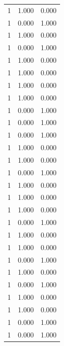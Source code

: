\begin{tabular}{rrr}
1 & 1.000 & 0.000 \\
1 & 0.000 & 1.000 \\
1 & 1.000 & 0.000 \\
1 & 0.000 & 1.000 \\
1 & 1.000 & 0.000 \\
1 & 1.000 & 0.000 \\
1 & 1.000 & 0.000 \\
1 & 1.000 & 0.000 \\
1 & 0.000 & 1.000 \\
1 & 0.000 & 1.000 \\
1 & 0.000 & 1.000 \\
1 & 1.000 & 0.000 \\
1 & 1.000 & 0.000 \\
1 & 0.000 & 1.000 \\
1 & 1.000 & 0.000 \\
1 & 1.000 & 0.000 \\
1 & 1.000 & 0.000 \\
1 & 0.000 & 1.000 \\
1 & 1.000 & 0.000 \\
1 & 1.000 & 0.000 \\
1 & 0.000 & 1.000 \\
1 & 1.000 & 0.000 \\
1 & 0.000 & 1.000 \\
1 & 1.000 & 0.000 \\
1 & 1.000 & 0.000 \\
1 & 0.000 & 1.000 \\
1 & 0.000 & 1.000 \\
\bottomrule
\end{tabular}
